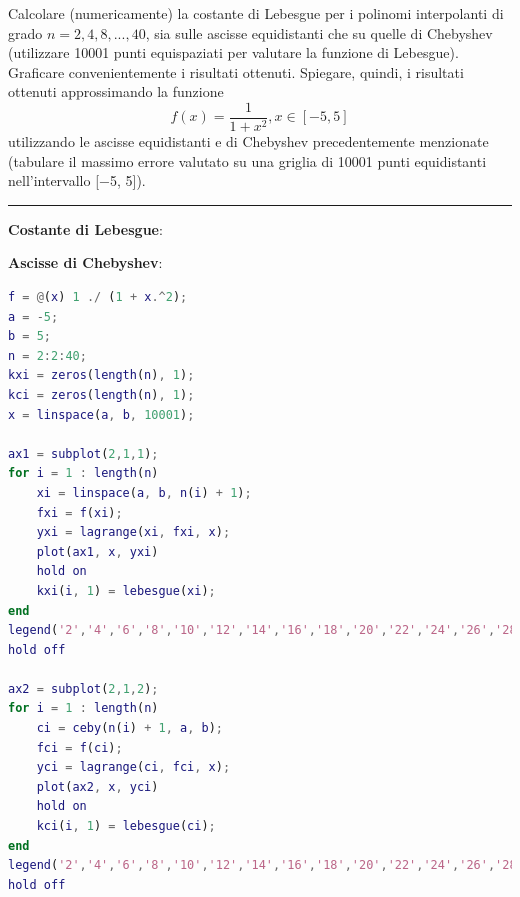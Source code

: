 Calcolare (numericamente) la costante di Lebesgue per i polinomi interpolanti di grado $n = 2, 4, 8, ... , 40$, sia sulle ascisse equidistanti che su quelle di Chebyshev (utilizzare 10001 punti equispaziati per valutare la funzione di Lebesgue). Graficare convenientemente i risultati ottenuti. Spiegare, quindi, i risultati ottenuti approssimando la funzione
$$f(x)=\frac{1}{1+x^{2}},x\in[−5,5]$$
utilizzando le ascisse equidistanti e di Chebyshev precedentemente menzionate (tabulare il massimo errore valutato su una griglia di 10001 punti equidistanti nell’intervallo [−5, 5]).

\hspace{1cm}
\par\noindent\rule{\textwidth}{0.4pt}
\hspace{1cm}

\textbf{Costante di Lebesgue}:

\textbf{Ascisse di Chebyshev}:


\begin{lstlisting}[language=Matlab, caption=Codice Matlab]
f = @(x) 1 ./ (1 + x.^2);
a = -5;
b = 5;
n = 2:2:40;
kxi = zeros(length(n), 1);
kci = zeros(length(n), 1);
x = linspace(a, b, 10001);

ax1 = subplot(2,1,1);
for i = 1 : length(n)
	xi = linspace(a, b, n(i) + 1);
	fxi = f(xi);
	yxi = lagrange(xi, fxi, x);
	plot(ax1, x, yxi)
	hold on
	kxi(i, 1) = lebesgue(xi);
end
legend('2','4','6','8','10','12','14','16','18','20','22','24','26','28','30','32','34','36','38','40')
hold off

ax2 = subplot(2,1,2);
for i = 1 : length(n)
	ci = ceby(n(i) + 1, a, b);
	fci = f(ci);
	yci = lagrange(ci, fci, x);
	plot(ax2, x, yci)
	hold on
	kci(i, 1) = lebesgue(ci);
end
legend('2','4','6','8','10','12','14','16','18','20','22','24','26','28','30','32','34','36','38','40')
hold off
\end{lstlisting}


